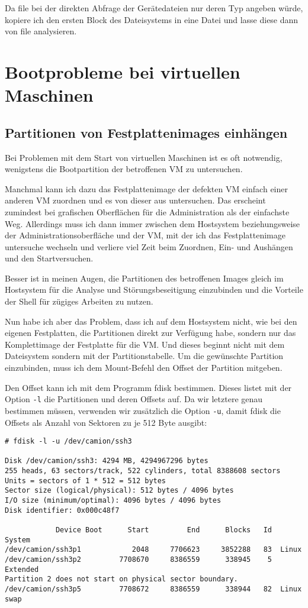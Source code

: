 Da file bei der direkten Abfrage der Gerätedateien nur deren Typ angeben
würde, kopiere ich den ersten Block des Dateisystems in eine Datei und lasse
diese dann von file analysieren.

\section{Bootprobleme bei virtuellen Maschinen}
\label{sec:lokal-bootprobleme-vm}

\subsection*{Partitionen von Festplattenimages einhängen}
\label{sec:mount-hdimage-partition}

Bei Problemen mit dem Start von virtuellen Maschinen ist es oft notwendig,
wenigstens die Bootpartition der betroffenen VM zu untersuchen.

Manchmal kann
ich dazu das Festplattenimage der defekten VM einfach einer anderen VM
zuordnen und es von dieser aus untersuchen. Das erscheint zumindest bei
grafischen Oberflächen für die Administration als der einfachste Weg.
Allerdings muss ich dann immer zwischen dem Hostsystem beziehungsweise der
Administrationsoberfläche und der VM, mit der ich das Festplattenimage
untersuche wechseln und verliere viel Zeit beim Zuordnen, Ein- und Aushängen
und den Startversuchen.

Besser ist in meinen Augen, die Partitionen des betroffenen Images gleich im
Hostsystem für die Analyse und Störungsbeseitigung einzubinden und die
Vorteile der Shell für zügiges Arbeiten zu nutzen.

Nun habe ich aber das Problem, dass ich auf dem Hostsystem nicht, wie bei den
eigenen Festplatten, die Partitionen direkt zur Verfügung habe, sondern nur
das Komplettimage der Festplatte für die VM. Und dieses beginnt nicht mit dem
Dateisystem sondern mit der Partitionstabelle. Um die gewünschte Partition
einzubinden, muss ich dem Mount-Befehl den Offset der Partition mitgeben.

Den Offset kann ich mit dem Programm fdisk bestimmen. Dieses listet mit der
Option \verb?-l? die Partitionen und deren Offsets auf. Da wir letztere genau
bestimmen müssen, verwenden wir zusätzlich die Option \verb?-u?, damit fdisk
die Offsets als Anzahl von Sektoren zu je 512 Byte ausgibt:

\begin{verbatim}
# fdisk -l -u /dev/camion/ssh3 

Disk /dev/camion/ssh3: 4294 MB, 4294967296 bytes
255 heads, 63 sectors/track, 522 cylinders, total 8388608 sectors
Units = sectors of 1 * 512 = 512 bytes
Sector size (logical/physical): 512 bytes / 4096 bytes
I/O size (minimum/optimal): 4096 bytes / 4096 bytes
Disk identifier: 0x000c48f7

            Device Boot      Start         End      Blocks   Id  System
/dev/camion/ssh3p1            2048     7706623     3852288   83  Linux
/dev/camion/ssh3p2         7708670     8386559      338945    5  Extended
Partition 2 does not start on physical sector boundary.
/dev/camion/ssh3p5         7708672     8386559      338944   82  Linux swap
\end{verbatim}

